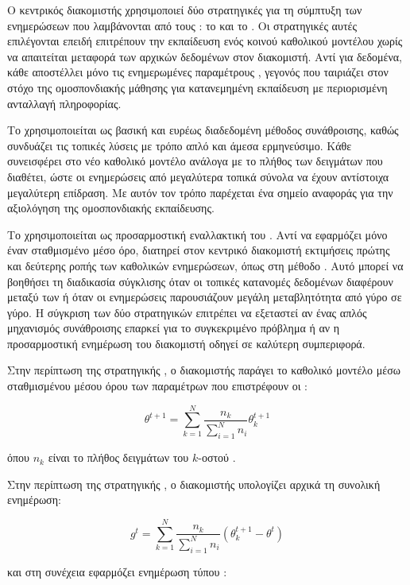 Ο  κεντρικός διακομιστής χρησιμοποιεί δύο στρατηγικές για τη σύμπτυξη των ενημερώσεων που λαμβάνονται από τους : το  \cite{mcmahan2017communication} και το  \cite{reddi2020adaptive}. Οι στρατηγικές αυτές επιλέγονται επειδή επιτρέπουν την εκπαίδευση ενός κοινού καθολικού μοντέλου χωρίς να απαιτείται μεταφορά των αρχικών δεδομένων στον διακομιστή. Αντί για δεδομένα, κάθε  αποστέλλει μόνο τις ενημερωμένες παραμέτρους , γεγονός που ταιριάζει στον στόχο της ομοσπονδιακής μάθησης για κατανεμημένη εκπαίδευση με περιορισμένη ανταλλαγή πληροφορίας.

Το  χρησιμοποιείται ως βασική και ευρέως διαδεδομένη μέθοδος συνάθροισης, καθώς συνδυάζει τις τοπικές λύσεις με τρόπο απλό και άμεσα ερμηνεύσιμο. Κάθε  συνεισφέρει στο νέο καθολικό μοντέλο ανάλογα με το πλήθος των δειγμάτων που διαθέτει, ώστε οι ενημερώσεις από μεγαλύτερα τοπικά σύνολα να έχουν αντίστοιχα μεγαλύτερη επίδραση. Με αυτόν τον τρόπο παρέχεται ένα σημείο αναφοράς για την αξιολόγηση της ομοσπονδιακής εκπαίδευσης.

Το  χρησιμοποιείται ως προσαρμοστική εναλλακτική του . Αντί να εφαρμόζει μόνο έναν σταθμισμένο μέσο όρο, διατηρεί στον κεντρικό διακομιστή εκτιμήσεις πρώτης και δεύτερης ροπής των καθολικών ενημερώσεων, όπως στη μέθοδο . Αυτό μπορεί να βοηθήσει τη διαδικασία σύγκλισης όταν οι τοπικές κατανομές δεδομένων διαφέρουν μεταξύ των  ή όταν οι ενημερώσεις παρουσιάζουν μεγάλη μεταβλητότητα από γύρο σε γύρο. Η σύγκριση των δύο στρατηγικών επιτρέπει να εξεταστεί αν ένας απλός μηχανισμός συνάθροισης επαρκεί για το συγκεκριμένο πρόβλημα ή αν η προσαρμοστική ενημέρωση του διακομιστή οδηγεί σε καλύτερη συμπεριφορά.

Στην περίπτωση της στρατηγικής , ο διακομιστής παράγει το καθολικό μοντέλο μέσω σταθμισμένου μέσου όρου των παραμέτρων που επιστρέφουν οι :

\[
\theta^{t+1}
=
\sum_{k=1}^{N}
\frac{n_k}{\sum_{i=1}^{N}n_i}
\theta_k^{t+1}
\]

όπου $n_k$ είναι το πλήθος δειγμάτων του $k$-οστού .

Στην περίπτωση της στρατηγικής , ο διακομιστής υπολογίζει αρχικά τη συνολική ενημέρωση:

\[
g^t
=
\sum_{k=1}^{N}
\frac{n_k}{\sum_{i=1}^{N}n_i}
\left(
\theta_k^{t+1}
-
\theta^t
\right)
\]

και στη συνέχεια εφαρμόζει ενημέρωση τύπου :


